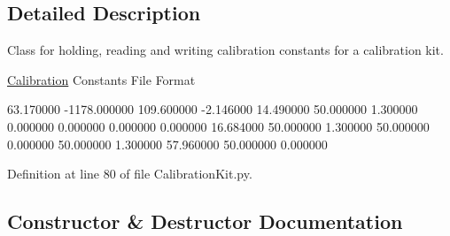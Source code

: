 \subsection{Detailed Description}
Class for holding, reading and writing calibration constants for a calibration kit. 

\hyperlink{namespaceSignalIntegrity_1_1Measurement_1_1Calibration}{Calibration} Constants File Format

\begin{DoxyVerb}     %
     63.170000 
     -1178.000000
     109.600000
     -2.146000
     14.490000
     50.000000
     1.300000
     0.000000
     0.000000
     0.000000
     0.000000
     16.684000
     50.000000
     1.300000
     50.000000
     0.000000
     50.000000
     1.300000
     57.960000
     50.000000
     0.000000\end{DoxyVerb}
 

Definition at line 80 of file Calibration\+Kit.\+py.



\subsection{Constructor \& Destructor Documentation}
\mbox{\label{classSignalIntegrity_1_1Measurement_1_1CalKit_1_1CalibrationKit_1_1CalibrationConstants_ae64f0875afe3067b97ba370b354b9213}} 
